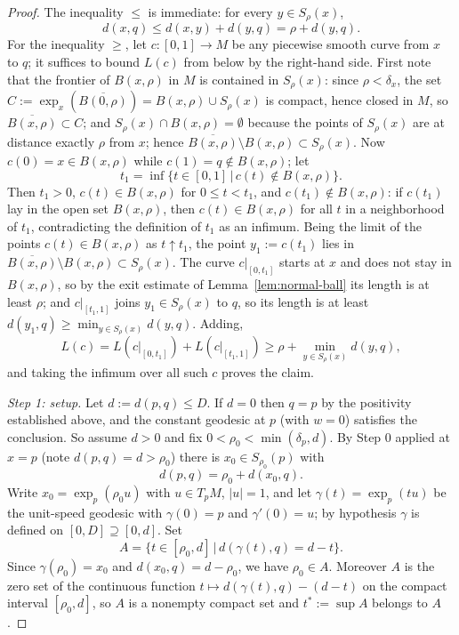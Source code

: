\begin{proof}
The inequality $\le$ is immediate: for every $y\in S_\rho(x)$,
$$d(x,q)\le d(x,y)+d(y,q)=\rho+d(y,q).$$
For the inequality $\ge$, let $c\colon[0,1]\to M$ be any piecewise
smooth curve from $x$ to $q$; it suffices to bound $L(c)$ from
below by the right-hand side. First note that the frontier of
$B(x,\rho)$ in $M$ is contained in $S_\rho(x)$: since
$\rho<\delta_x$, the set
$C:=\exp_x\left(\overline{B(0,\rho)}\right)
=B(x,\rho)\cup S_\rho(x)$ is compact, hence closed in $M$, so
$\overline{B(x,\rho)}\subset C$; and $S_\rho(x)\cap
B(x,\rho)=\emptyset$ because the points of $S_\rho(x)$ are at
distance exactly $\rho$ from $x$; hence
$\overline{B(x,\rho)}\setminus B(x,\rho)\subset S_\rho(x)$. Now
$c(0)=x\in B(x,\rho)$ while $c(1)=q\notin B(x,\rho)$; let
$$t_1=\inf\{t\in[0,1]\,|\,c(t)\notin B(x,\rho)\}.$$
Then $t_1>0$, $c(t)\in B(x,\rho)$ for $0\le t<t_1$, and
$c(t_1)\notin B(x,\rho)$: if $c(t_1)$ lay in the open set
$B(x,\rho)$, then $c(t)\in B(x,\rho)$ for all $t$ in a
neighborhood of $t_1$, contradicting the definition of $t_1$ as an
infimum. Being the limit of the points $c(t)\in B(x,\rho)$ as
$t\uparrow t_1$, the point $y_1:=c(t_1)$ lies in
$\overline{B(x,\rho)}\setminus B(x,\rho)\subset S_\rho(x)$. The
curve $c|_{[0,t_1]}$ starts at $x$ and does not stay in
$B(x,\rho)$, so by the exit estimate of
Lemma~\ref{lem:normal-ball} its length is at least $\rho$; and
$c|_{[t_1,1]}$ joins $y_1\in S_\rho(x)$ to $q$, so its length is
at least $d(y_1,q)\ge\min_{y\in S_\rho(x)}d(y,q)$. Adding,
$$L(c)=L\left(c|_{[0,t_1]}\right)+L\left(c|_{[t_1,1]}\right)
\ge\rho+\min_{y\in S_\rho(x)}d(y,q),$$
and taking the infimum over all such $c$ proves the claim.

\emph{Step 1: setup.} Let $d:=d(p,q)\le D$. If $d=0$ then $q=p$ by
the positivity established above, and the constant geodesic at $p$
(with $w=0$) satisfies the conclusion. So assume $d>0$ and fix
$0<\rho_0<\min(\delta_p,d)$. By Step 0 applied at $x=p$ (note
$d(p,q)=d>\rho_0$) there is $x_0\in S_{\rho_0}(p)$ with
$$d(p,q)=\rho_0+d(x_0,q).$$
Write $x_0=\exp_p(\rho_0u)$ with $u\in T_pM$, $|u|=1$, and let
$\gamma(t)=\exp_p(tu)$ be the unit-speed geodesic with
$\gamma(0)=p$ and $\gamma'(0)=u$; by hypothesis $\gamma$ is
defined on $[0,D]\supseteq[0,d]$. Set
$$A=\{t\in[\rho_0,d]\,|\,d(\gamma(t),q)=d-t\}.$$
Since $\gamma(\rho_0)=x_0$ and $d(x_0,q)=d-\rho_0$, we have
$\rho_0\in A$. Moreover $A$ is the zero set of the continuous
function $t\mapsto d(\gamma(t),q)-(d-t)$ on the compact interval
$[\rho_0,d]$, so $A$ is a nonempty compact set and $t^*:=\sup A$
belongs to $A$.


\end{proof}
